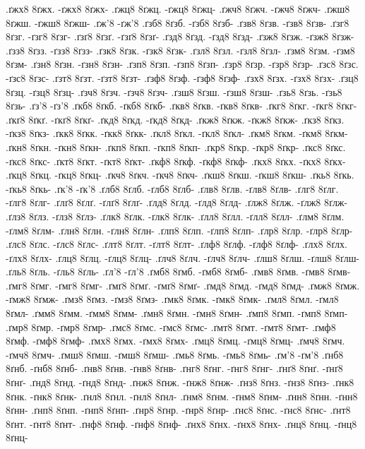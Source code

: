 {.ґжх8 8ґжх. -ґжх8 8ґжх-
.ґжц8 8ґжц. -ґжц8 8ґжц-
.ґжч8 8ґжч. -ґжч8 8ґжч-
.ґжш8 8ґжш. -ґжш8 8ґжш-
.ґж'8 -ґж'8
.ґзб8 8ґзб. -ґзб8 8ґзб-
.ґзв8 8ґзв. -ґзв8 8ґзв-
.ґзг8 8ґзг. -ґзг8 8ґзг-
.ґзґ8 8ґзґ. -ґзґ8 8ґзґ-
.ґзд8 8ґзд. -ґзд8 8ґзд-
.ґзж8 8ґзж. -ґзж8 8ґзж-
.ґзз8 8ґзз. -ґзз8 8ґзз-
.ґзк8 8ґзк. -ґзк8 8ґзк-
.ґзл8 8ґзл. -ґзл8 8ґзл-
.ґзм8 8ґзм. -ґзм8 8ґзм-
.ґзн8 8ґзн. -ґзн8 8ґзн-
.ґзп8 8ґзп. -ґзп8 8ґзп-
.ґзр8 8ґзр. -ґзр8 8ґзр-
.ґзс8 8ґзс. -ґзс8 8ґзс-
.ґзт8 8ґзт. -ґзт8 8ґзт-
.ґзф8 8ґзф. -ґзф8 8ґзф-
.ґзх8 8ґзх. -ґзх8 8ґзх-
.ґзц8 8ґзц. -ґзц8 8ґзц-
.ґзч8 8ґзч. -ґзч8 8ґзч-
.ґзш8 8ґзш. -ґзш8 8ґзш-
.ґзь8 8ґзь. -ґзь8 8ґзь-
.ґз'8 -ґз'8
.ґкб8 8ґкб. -ґкб8 8ґкб-
.ґкв8 8ґкв. -ґкв8 8ґкв-
.ґкг8 8ґкг. -ґкг8 8ґкг-
.ґкґ8 8ґкґ. -ґкґ8 8ґкґ-
.ґкд8 8ґкд. -ґкд8 8ґкд-
.ґкж8 8ґкж. -ґкж8 8ґкж-
.ґкз8 8ґкз. -ґкз8 8ґкз-
.ґкк8 8ґкк. -ґкк8 8ґкк-
.ґкл8 8ґкл. -ґкл8 8ґкл-
.ґкм8 8ґкм. -ґкм8 8ґкм-
.ґкн8 8ґкн. -ґкн8 8ґкн-
.ґкп8 8ґкп. -ґкп8 8ґкп-
.ґкр8 8ґкр. -ґкр8 8ґкр-
.ґкс8 8ґкс. -ґкс8 8ґкс-
.ґкт8 8ґкт. -ґкт8 8ґкт-
.ґкф8 8ґкф. -ґкф8 8ґкф-
.ґкх8 8ґкх. -ґкх8 8ґкх-
.ґкц8 8ґкц. -ґкц8 8ґкц-
.ґкч8 8ґкч. -ґкч8 8ґкч-
.ґкш8 8ґкш. -ґкш8 8ґкш-
.ґкь8 8ґкь. -ґкь8 8ґкь-
.ґк'8 -ґк'8
.ґлб8 8ґлб. -ґлб8 8ґлб-
.ґлв8 8ґлв. -ґлв8 8ґлв-
.ґлг8 8ґлг. -ґлг8 8ґлг-
.ґлґ8 8ґлґ. -ґлґ8 8ґлґ-
.ґлд8 8ґлд. -ґлд8 8ґлд-
.ґлж8 8ґлж. -ґлж8 8ґлж-
.ґлз8 8ґлз. -ґлз8 8ґлз-
.ґлк8 8ґлк. -ґлк8 8ґлк-
.ґлл8 8ґлл. -ґлл8 8ґлл-
.ґлм8 8ґлм. -ґлм8 8ґлм-
.ґлн8 8ґлн. -ґлн8 8ґлн-
.ґлп8 8ґлп. -ґлп8 8ґлп-
.ґлр8 8ґлр. -ґлр8 8ґлр-
.ґлс8 8ґлс. -ґлс8 8ґлс-
.ґлт8 8ґлт. -ґлт8 8ґлт-
.ґлф8 8ґлф. -ґлф8 8ґлф-
.ґлх8 8ґлх. -ґлх8 8ґлх-
.ґлц8 8ґлц. -ґлц8 8ґлц-
.ґлч8 8ґлч. -ґлч8 8ґлч-
.ґлш8 8ґлш. -ґлш8 8ґлш-
.ґль8 8ґль. -ґль8 8ґль-
.ґл'8 -ґл'8
.ґмб8 8ґмб. -ґмб8 8ґмб-
.ґмв8 8ґмв. -ґмв8 8ґмв-
.ґмг8 8ґмг. -ґмг8 8ґмг-
.ґмґ8 8ґмґ. -ґмґ8 8ґмґ-
.ґмд8 8ґмд. -ґмд8 8ґмд-
.ґмж8 8ґмж. -ґмж8 8ґмж-
.ґмз8 8ґмз. -ґмз8 8ґмз-
.ґмк8 8ґмк. -ґмк8 8ґмк-
.ґмл8 8ґмл. -ґмл8 8ґмл-
.ґмм8 8ґмм. -ґмм8 8ґмм-
.ґмн8 8ґмн. -ґмн8 8ґмн-
.ґмп8 8ґмп. -ґмп8 8ґмп-
.ґмр8 8ґмр. -ґмр8 8ґмр-
.ґмс8 8ґмс. -ґмс8 8ґмс-
.ґмт8 8ґмт. -ґмт8 8ґмт-
.ґмф8 8ґмф. -ґмф8 8ґмф-
.ґмх8 8ґмх. -ґмх8 8ґмх-
.ґмц8 8ґмц. -ґмц8 8ґмц-
.ґмч8 8ґмч. -ґмч8 8ґмч-
.ґмш8 8ґмш. -ґмш8 8ґмш-
.ґмь8 8ґмь. -ґмь8 8ґмь-
.ґм'8 -ґм'8
.ґнб8 8ґнб. -ґнб8 8ґнб-
.ґнв8 8ґнв. -ґнв8 8ґнв-
.ґнг8 8ґнг. -ґнг8 8ґнг-
.ґнґ8 8ґнґ. -ґнґ8 8ґнґ-
.ґнд8 8ґнд. -ґнд8 8ґнд-
.ґнж8 8ґнж. -ґнж8 8ґнж-
.ґнз8 8ґнз. -ґнз8 8ґнз-
.ґнк8 8ґнк. -ґнк8 8ґнк-
.ґнл8 8ґнл. -ґнл8 8ґнл-
.ґнм8 8ґнм. -ґнм8 8ґнм-
.ґнн8 8ґнн. -ґнн8 8ґнн-
.ґнп8 8ґнп. -ґнп8 8ґнп-
.ґнр8 8ґнр. -ґнр8 8ґнр-
.ґнс8 8ґнс. -ґнс8 8ґнс-
.ґнт8 8ґнт. -ґнт8 8ґнт-
.ґнф8 8ґнф. -ґнф8 8ґнф-
.ґнх8 8ґнх. -ґнх8 8ґнх-
.ґнц8 8ґнц. -ґнц8 8ґнц-
}
